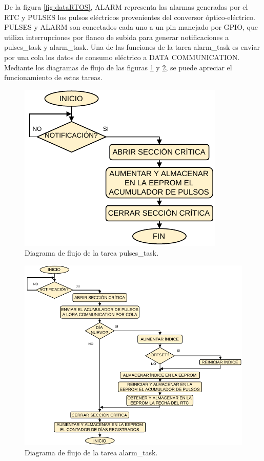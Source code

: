 De la figura \ref{fig:dataRTOS}, ALARM representa las alarmas generadas por el RTC y PULSES los pulsos eléctricos provenientes del conversor óptico-eléctrico. PULSES y ALARM son conectados cada uno a un pin manejado por GPIO, que utiliza interrupciones por flanco de subida para generar notificaciones a pulses\_task y alarm\_task. Una de las funciones de la tarea alarm\_task es enviar por una cola los datos de consumo eléctrico a DATA COMMUNICATION.  Mediante los diagramas de flujo de las figuras \ref{fig:flowDataPulses} y \ref{fig:flowDataAlarm}, se puede apreciar el funcionamiento de estas tareas.

\begin{figure}[h]
	\centering
	\includegraphics[scale=0.91]{./Figures/data_logger_pulses.pdf}
	\caption{Diagrama de flujo de la tarea pulses\_task.}
		\label{fig:flowDataPulses}
\end{figure}

\begin{figure}[h]
	\centering
	\includegraphics[scale=0.91]{./Figures/data_logger_alarm.pdf}
	\caption{Diagrama de flujo de la tarea alarm\_task.}
		\label{fig:flowDataAlarm}
\end{figure}

